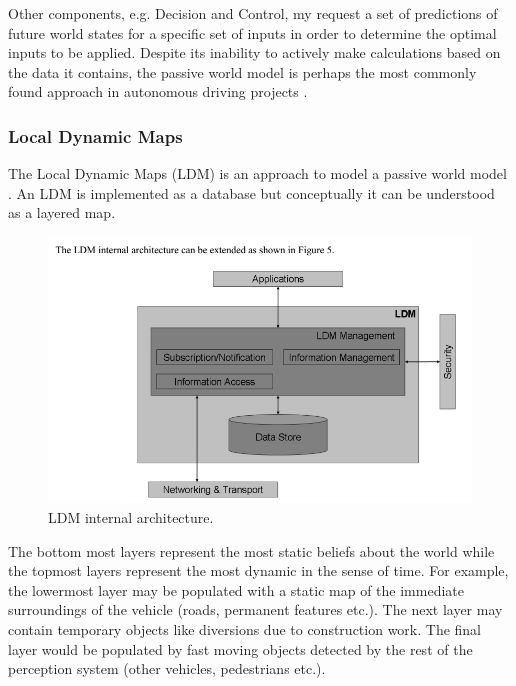 Other components, e.g. Decision and Control, my request a set of predictions of future world states for a specific set of
inputs in order to determine the optimal inputs to be applied.
Despite its inability to actively make calculations based on the data it contains, the passive world model is perhaps the most commonly found approach in autonomous driving projects \cite{Bahere}. 


\subsubsection{Local Dynamic Maps}

The Local Dynamic Maps (LDM) is an approach to model a passive world model \cite{Bahere, ETSITR102}. 
An LDM is implemented as a database but conceptually it can be understood as a layered map. 

\begin{figure}[!htb]
\begin{center}
\includegraphics[scale=0.380]{img/ldm_internal_architectuer.png}
\end{center}
\caption{LDM internal architecture.}
\label{ldm_internal_architectuer}
\end{figure}

The bottom most layers represent the most static beliefs about the world while the topmost layers represent the most dynamic in the sense of time. For example, the lowermost layer may be populated with a static map of the immediate surroundings of the vehicle (roads, permanent features etc.). The next layer may contain temporary objects
like diversions due to construction work. The final layer would be populated by fast moving objects detected by the rest of the perception system (other vehicles, pedestrians etc.)\cite{ETSITR102}. 

